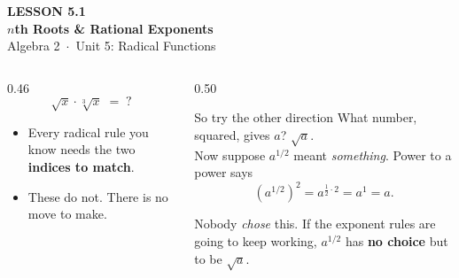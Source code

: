 \documentclass[aspectratio=169, 11pt]{beamer}
\begin{document}
{
\begin{frame}[plain]
  \vspace{2.8cm}\hspace{0.55cm}%
  \begin{minipage}{0.9\textwidth}
    {\color{goldacc}\bfseries\small LESSON 5.1}\\[0.5cm]
    {\color{white}\bfseries\LARGE $n$th Roots \& Rational Exponents}\\[1.2cm]
    {\color{forestmid}\small Algebra 2~$\cdot$~Unit 5: Radical Functions}
  \end{minipage}
\end{frame}
}

\begin{frame}[t, plain]
  \begin{columns}[T]
    \begin{column}{0.46\textwidth}
      \[ \sqrt{x}\cdot\sqrt[3]{x} \;=\; ? \]
      \begin{itemize}\setlength{\itemsep}{5pt}
        \item Every radical rule you know needs the two \textbf{indices to match}.
        \item These do not. There is no move to make.
      \end{itemize}
    \end{column}
    \begin{column}{0.50\textwidth}
      \begin{block}{So try the other direction}
        What number, squared, gives $a$? \; $\sqrt{a}$. \\[4pt]
        Now suppose $a^{1/2}$ meant \emph{something}. Power to a power says
        \[ \left(a^{1/2}\right)^{2} = a^{\frac12\cdot 2} = a^{1} = a . \]
      \end{block}
      \vspace{2pt}
      {\footnotesize Nobody \emph{chose} this. If the exponent rules are going to keep working,
      $a^{1/2}$ has \textbf{no choice} but to be $\sqrt{a}$.}
    \end{column}
  \end{columns}
\end{frame}
\end{document}
